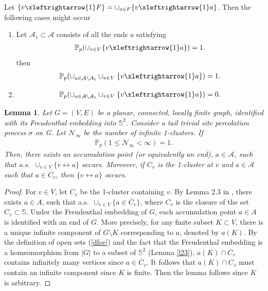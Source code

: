 \documentclass[11pt]{amsart}
\theoremstyle{plain}
\newtheorem{lemma}[theorem]{Lemma}
\numberwithin{equation}{section}
\numberwithin{figure}{section}
\newcommand\PP{{\mathbb P}}
\begin{document}
Let $\{v\xleftrightarrow{1} F\}=\cup_{a\in F}\{v\xleftrightarrow{1} a\}$.
Then the following cases might occur
\begin{enumerate}[label=(\alph*)]
\item Let $\mathcal{A}_1\subset \mathcal{A}$ consists of all the ends $a$ satisfying
\begin{align}
\PP_p(\cup_{v\in V}\{v\xleftrightarrow{1} a\})=1.\label{ccds}
\end{align}
then
\begin{align}
\PP_p(\cup_{a\in \mathcal{A}\setminus \mathcal{A}_1 }\cup_{v\in V}\{v\xleftrightarrow{1} a\})=1.\label{sst}
\end{align}

\item 
\begin{align}
\PP_p(\cup_{a\in \mathcal{A}\setminus \mathcal{A}_1 }\cup_{v\in V}\{v\xleftrightarrow{1} a\})=0.\label{sst1}
\end{align}
\end{enumerate}

\begin{lemma}\label{le76}Let $G=(V,E)$ be a planar, connected, locally finite graph, identified with its Freudenthal embedding into $\mathbb{S}^2$. Consider a tail trivial
site percolation process $\sigma$ on G. Let $\mathcal{N}_{\infty}$ be the number of infinite 1-clusters.
If
\begin{align}
\PP_p(1\leq \mathcal{N}_{\infty}<\infty)=1.\label{fi1}
\end{align} 
Then, there exists an accumulation point (or equivalently an end), $a\in \mathcal{A}$, such that a.s.~$\cup_{v\in V}\{v\leftrightarrow a\}$ occurs. Moreover, if $C_v$ is the 1-cluster at $v$ and $a\in \mathcal{A}$ such that $a\in \overline{C_v}$, then $\{v\leftrightarrow a\}$ occurs.
\end{lemma}

\begin{proof}For $v\in V$, let $C_v$ be the 1-cluster containing $v$. By Lemma 2.3 in \cite{GHZ25}, there exists $a\in A$, such that a.s.~$\cup_{v\in V}\{a\in \overline{C}_v\}$, where $C_v$ is the closure of the set $C_v\subset \mathbb{S}$. Under the Freudenthal embedding of $G$, each accumulation point $a\in A$ is identified with an end of $G$. More precisely, for any finite subset $K\subset V$, there is a unique infinite component of $G\setminus K$ corresponding to $a$, denoted by $a(K)$. By the definition of open sets (\ref{dfce}) and the fact that the Freudenthal embedding is a homeomorphism from $|G|$ to a subset of $\mathbb{S}^2$ (Lemma \ref{l23}), $a(K)\cap C_v$ contains infinitely many vertices since $a\in \overline{C}_v$.  It follows that $a(K)\cap C_v$ must contain an infinite component since $K$ is finite. Then the lemma follows since $K$ is arbitrary.
\end{proof}
\end{document}
